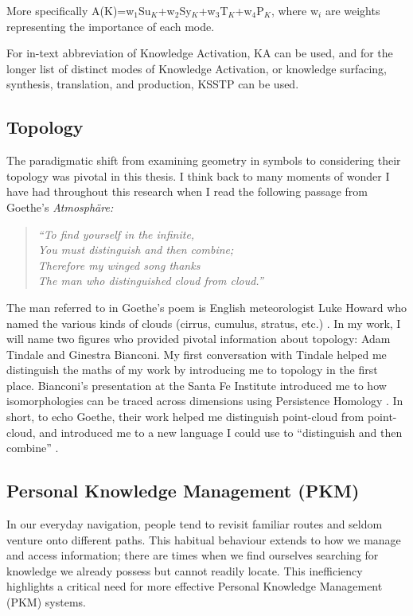 More specifically A(K)=w$_1$Su$_K$+w$_2$Sy$_K$+w$_3$T$_K$+w$_4$P$_K$, where w$_i$ are weights representing the importance of each mode.

For in-text abbreviation of Knowledge Activation, KA can be used, and for the longer list of distinct modes of Knowledge Activation, or knowledge surfacing, synthesis, translation, and production, KSSTP can be used.


\subsection{Topology}
The paradigmatic shift from examining geometry in symbols to considering their topology was pivotal in this thesis. I think back to many moments of wonder I have had throughout this research when I read the following passage from Goethe’s \textit{Atmosphäre:}
\begin{quote} 
\textit{“To find yourself in the infinite,\\
You must distinguish and then combine; \\
Therefore my winged song thanks \\
The man who distinguished cloud from cloud.” \\}
\citep{popova_how_2015} \citep[p. 107]{goethe_goethes_1836}
\end{quote}
The man referred to in Goethe’s poem is English meteorologist Luke Howard who named the various kinds of clouds (cirrus, cumulus, stratus, etc.) \citep{howard_essay_1803}. In my work, I will name two figures who provided pivotal information about topology: Adam Tindale and Ginestra Bianconi. My first conversation with Tindale helped me distinguish the maths of my work by introducing me to topology in the first place. Bianconi’s presentation at the Santa Fe Institute introduced me to how isomorphologies can be traced across dimensions using Persistence Homology \citep{bianconi_general_2024} \citep{bianconi_topology_2024}. In short, to echo Goethe, their work helped me distinguish point-cloud from point-cloud, and introduced me to a new language I could use to “distinguish and then combine” \citep{popova_how_2015}. 

\subsection{Personal Knowledge Management (PKM)}
In our everyday navigation, people tend to revisit familiar routes and seldom venture onto different paths. This habitual behaviour extends to how we manage and access information; there are times when we find ourselves searching for knowledge we already possess but cannot readily locate. This inefficiency highlights a critical need for more effective Personal Knowledge Management (PKM) systems.

